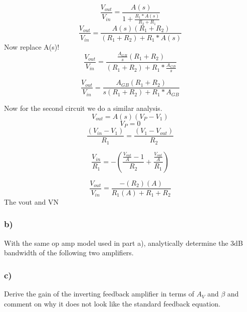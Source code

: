 \documentclass[10pt,a4paper]{article}
\begin{document}
\begin{equation}
\frac{V_{out}}{V_{in}} = \frac{A(s)}{1+\frac{R_1 * A(s)}{R_2 + R_1}} 
\end{equation}
\begin{equation}
\frac{V_{out}}{V_{in}} = \frac{A(s)(R_1 + R_2)}{(R_1 + R_2) + R_1 * A(s)} 
\end{equation}
Now replace A(s)!
\begin{equation}
\frac{V_{out}}{V_{in}} = \frac{\frac{A_{GB}}{s}(R_1 + R_2)}{(R_1 + R_2) + R_1 * \frac{A_{GB}}{s}} 
\end{equation}

\begin{equation}
\frac{V_{out}}{V_{in}} = \frac{A_{GB}(R_1 + R_2)}{s(R_1 + R_2) + R_1 * A_{GB}} 
\end{equation}


Now for the second circuit we do a similar analysis.
\begin{equation}
V_{out} = A(s)(V_P - V_1)
\end{equation}
\begin{equation}
V_P = 0
\end{equation}
\begin{equation}
\frac{(V_{in} - V_{1})}{R_1} = \frac{(V_{1} - V_{out})}{R_2}
\end{equation}

\begin{equation}
\frac{V_{in}}{R_1} = -(\frac{\frac{V_{out}}{A} - 1}{R_2} + \frac{\frac{V_{out}}{A}}{R_1})
\end{equation}

\begin{equation}
\frac{V_{out}}{V_{in}} = \frac{-(R_2)(A)}{R_1(A) + R_1 + R_2}
\end{equation}
The vout and VN



\subsubsection*{b)}
With the same op amp model used in part a), analytically determine the 3dB
bandwidth of the following two amplifiers.



\subsubsection*{c)}
Derive the gain of the inverting feedback amplifier in terms of \(A_{V}\) and \(\beta\) and
comment on why it does not look like the standard feedback equation.
\end{document}
